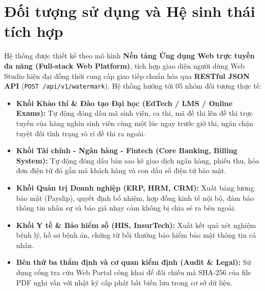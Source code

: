 \documentclass[12pt,a4paper]{report}
\begin{document}
\section{Đối tượng sử dụng và Hệ sinh thái tích hợp}
Hệ thống được thiết kế theo mô hình \textbf{Nền tảng Ứng dụng Web trực tuyến đa năng (Full-stack Web Platform)}, tích hợp giao diện người dùng Web Studio hiện đại đồng thời cung cấp giao tiếp chuẩn hóa qua \textbf{RESTful JSON API} (\texttt{POST /api/v1/watermark}). Hệ thống hướng tới 05 nhóm đối tượng thực tế:
\begin{itemize}
    \item \textbf{Khối Khảo thí \& Đào tạo Đại học (EdTech / LMS / Online Exams):} Tự động đóng dấu mã sinh viên, ca thi, mã đề thi lên đề thi trực tuyến của hàng nghìn sinh viên cùng một lúc ngay trước giờ thi, ngăn chặn tuyệt đối tình trạng rò rỉ đề thi ra ngoài.
    \item \textbf{Khối Tài chính - Ngân hàng - Fintech (Core Banking, Billing System):} Tự động đóng dấu bản sao kê giao dịch ngân hàng, phiếu thu, hóa đơn điện tử đỏ gắn mã khách hàng và con dấu số điện tử bảo mật.
    \item \textbf{Khối Quản trị Doanh nghiệp (ERP, HRM, CRM):} Xuất bảng lương bảo mật (Payslip), quyết định bổ nhiệm, hợp đồng kinh tế nội bộ, đảm bảo thông tin nhân sự và báo giá nhạy cảm không bị chia sẻ ra bên ngoài.
    \item \textbf{Khối Y tế \& Bảo hiểm số (HIS, InsurTech):} Xuất kết quả xét nghiệm bệnh lý, hồ sơ bệnh án, chứng từ bồi thường bảo hiểm bảo mật thông tin cá nhân.
    \item \textbf{Bên thứ ba thẩm định và cơ quan kiểm định (Audit \& Legal):} Sử dụng cổng tra cứu Web Portal công khai để đối chiếu mã SHA-256 của file PDF nghi vấn với nhật ký cấp phát bất biến lưu trong cơ sở dữ liệu.
\end{itemize}
\end{document}
